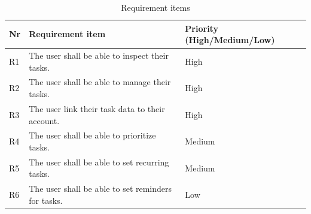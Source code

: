 \documentclass{article}
\begin{document}
\begin{table}[h]
  \centering
  \begin{tabularx}{\textwidth}{l|X|l}
    \toprule
    \textbf{Nr} & \textbf{Requirement item}                          & \textbf{Priority (High/Medium/Low)} \\
    \hline\hline
    R1          & The user shall be able to inspect their tasks.     & High                                \\
    \hline
    R2          & The user shall be able to manage their tasks.      & High                                \\
    \hline
    R3          & The user link their task data to their account.    & High                                \\
    \hline
    R4          & The user shall be able to prioritize tasks.        & Medium                              \\
    \hline
    R5          & The user shall be able to set recurring tasks.     & Medium                              \\
    \hline
    R6          & The user shall be able to set reminders for tasks. & Low                                 \\
    \bottomrule
  \end{tabularx}
  \caption{Requirement items}
  \label{Requirement items}
\end{table}
\end{document}
